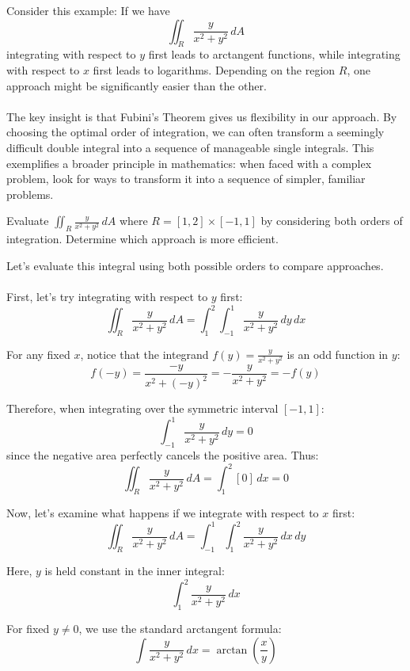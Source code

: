 \noindent Consider this example: If we have
\[
\iint_R \frac{y}{x^2+y^2} \,dA
\]
integrating with respect to $y$ first leads to arctangent functions, while integrating with respect to $x$ first leads to logarithms. Depending on the region $R$, one approach might be significantly easier than the other. \\ \\ The key insight is that Fubini's Theorem gives us flexibility in our approach. By choosing the optimal order of integration, we can often transform a seemingly difficult double integral into a sequence of manageable single integrals. This exemplifies a broader principle in mathematics: when faced with a complex problem, look for ways to transform it into a sequence of simpler, familiar problems.


\exampleline
\begin{example}
Evaluate \(\displaystyle\iint_R \frac{y}{x^2 + y^2} \,dA\) where $R = [1,2] \times [-1,1]$ by considering both orders of integration. Determine which approach is more efficient.

\begin{solution}
Let's evaluate this integral using both possible orders to compare approaches. \\ \\ First, let's try integrating with respect to $y$ first:
\[
\iint_R \frac{y}{x^2 + y^2} \,dA = \int_1^2 \int_{-1}^1 \frac{y}{x^2 + y^2} \,dy\,dx
\]

\noindent For any fixed $x$, notice that the integrand $f(y) = \frac{y}{x^2 + y^2}$ is an odd function in $y$:
\[
f(-y) = \frac{-y}{x^2 + (-y)^2} = -\frac{y}{x^2 + y^2} = -f(y)
\]

\noindent Therefore, when integrating over the symmetric interval $[-1,1]$:
\[
\int_{-1}^1 \frac{y}{x^2 + y^2} \,dy = 0
\]
 \noindent since the negative area perfectly cancels the positive area. Thus:
\[
\iint_R \frac{y}{x^2 + y^2} \,dA = \int_1^2 [0] \,dx = 0
\]

\noindent Now, let's examine what happens if we integrate with respect to $x$ first:
\[
\iint_R \frac{y}{x^2 + y^2} \,dA = \int_{-1}^1 \int_1^2 \frac{y}{x^2 + y^2} \,dx\,dy
\]

\noindent Here, $y$ is held constant in the inner integral:
\[
\int_1^2 \frac{y}{x^2 + y^2} \,dx
\]

\noindent For fixed \( y \neq 0 \), we use the standard arctangent formula:
\[
\int \frac{y}{x^2 + y^2} \, dx = \arctan\!\left(\frac{x}{y}\right)
\]


\end{solution}
\end{example}
